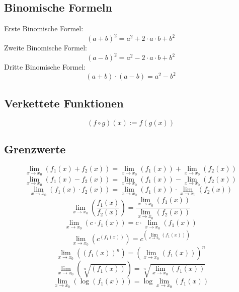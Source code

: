 \subsection{Binomische Formeln}
Erste Binomische Formel: 
\[ \boxed{(a + b)^2 = a^2 + 2 \cdot a \cdot b + b^2} \]Zweite Binomische Formel: 
\[ \boxed{(a - b)^2 = a^2 - 2 \cdot a \cdot b + b^2} \]Dritte Binomische Formel: 
\[ \boxed{(a + b) \cdot (a - b) = a^2 - b^2} \]

\subsection{Verkettete Funktionen}
\[ \boxed{(f \circ g)(x) := f(g(x))} \]

\subsection{Grenzwerte}
\[ \boxed{\lim\limits_{x \to x_0}(f_1(x) + f_2(x)) 
= \lim\limits_{x \to x_0}(f_1(x)) + \lim\limits_{x \to x_0}(f_2(x))} \]
\[ \boxed{\lim\limits_{x \to x_0}(f_1(x) - f_2(x)) 
= \lim\limits_{x \to x_0}(f_1(x)) - \lim\limits_{x \to x_0}(f_2(x))} \]
\[ \boxed{\lim\limits_{x \to x_0}(f_1(x) \cdot f_2(x)) 
= \lim\limits_{x \to x_0}(f_1(x)) \cdot \lim\limits_{x \to x_0}(f_2(x))} \]
\[ \boxed{\lim\limits_{x \to x_0}\left(\frac{f_1(x)}{f_2(x)}\right) 
= \frac{\lim\limits_{x \to x_0}(f_1(x))}{\lim\limits_{x \to x_0}(f_2(x))}} \]
\[ \boxed{\lim\limits_{x \to x_0}(c \cdot f_1(x)) 
= c \cdot \lim\limits_{x \to x_0}(f_1(x))} \]
\[ \boxed{\lim\limits_{x \to x_0}\left(c^{(f_1(x))}\right) 
= c^{\left(\lim\limits_{x \to x_0}(f_1(x))\right)}} \]
\[ \boxed{\lim\limits_{x \to x_0}\left((f_1(x))^n\right) 
= \left(\lim\limits_{x \to x_0}(f_1(x))\right)^n} \]
\[ \boxed{\lim\limits_{x \to x_0}\left(\sqrt[n]{(f_1(x))}\right) 
= \sqrt[n]{\lim\limits_{x \to x_0}(f_1(x))}} \]
\[ \boxed{\lim\limits_{x \to x_0}\left(\log{(f_1(x))}\right) 
= \log{\lim\limits_{x \to x_0}(f_1(x))}} \]

